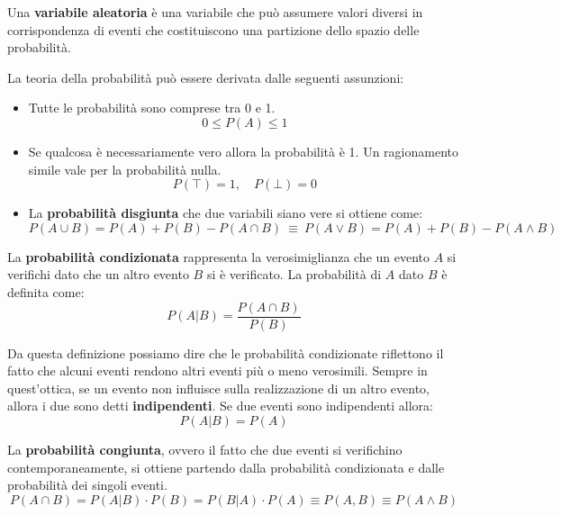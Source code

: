 \begin{definizione}
    Una \textbf{variabile aleatoria} è una variabile che può assumere valori
    diversi in corrispondenza di eventi che costituiscono una partizione dello
    spazio delle probabilità.
\end{definizione}
La teoria della probabilità può essere derivata dalle seguenti assunzioni:
\begin{itemize}
    \item Tutte le probabilità sono comprese tra 0 e 1.
          \begin{equation*}
              0 \leq P(A) \leq 1
          \end{equation*}
    \item Se qualcosa è necessariamente vero allora la probabilità è 1. Un
          ragionamento simile vale per la probabilità nulla.
          \begin{equation*}
              P(\top) = 1, \quad P(\bot) = 0
          \end{equation*}
    \item La \textbf{probabilità disgiunta} che due variabili siano vere si ottiene come:
          \begin{equation}
              P(A \cup B) = P(A) + P(B) - P(A \cap B) \ \equiv \ P(A \lor B) = P(A) + P(B) - P(A \land B)
          \end{equation}
\end{itemize}
\begin{definizione}
    La \textbf{probabilità condizionata} rappresenta la verosimiglianza che un
    evento $A$ si verifichi dato che un altro evento $B$ si è verificato.
    La probabilità di $A$ dato $B$ è definita come:
    \begin{equation}
        P(A|B) = \frac{P(A \cap B)}{P(B)}  
    \end{equation}
\end{definizione}
Da questa definizione possiamo dire che le probabilità condizionate riflettono
il fatto che alcuni eventi rendono altri eventi più o meno verosimili. Sempre
in quest'ottica, se un evento non influisce sulla realizzazione di un altro
evento, allora i due sono detti \textbf{indipendenti}. Se due eventi sono
indipendenti allora:
\begin{equation*}
    P(A | B) = P(A)
\end{equation*}
\begin{definizione}
    La \textbf{probabilità congiunta}, ovvero il fatto che due eventi si
    verifichino contemporaneamente, si ottiene partendo dalla probabilità
    condizionata e dalle probabilità dei singoli eventi.
    \begin{equation}
        P(A \cap B) = P(A|B) \cdot P(B) = P(B|A) \cdot P(A) \equiv P(A, B) \equiv P(A \land B)
    \end{equation}
\end{definizione}
